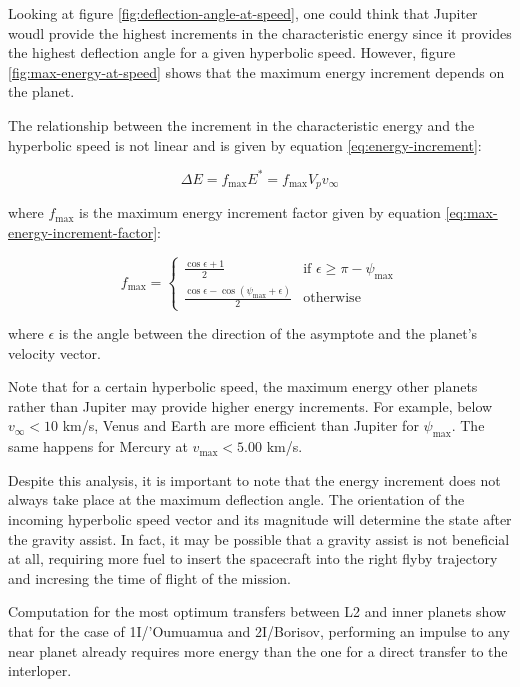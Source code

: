 Looking at figure \ref{fig:deflection-angle-at-speed}, one could think that
Jupiter woudl provide the highest increments in the characteristic energy since
it provides the highest deflection angle for a given hyperbolic speed. However,
figure \ref{fig:max-energy-at-speed} shows that the maximum energy increment
depends on the planet.

The relationship between the increment in the characteristic energy and the
hyperbolic speed is not linear and is given by equation
\ref{eq:energy-increment}:

\begin{equation}
  \Delta E = f_{\text{max}} E^{\ast} = f_{\text{max}} V_p v_{\infty}
  \label{eq:energy-increment}
\end{equation}

where $f_{\text{max}}$ is the maximum energy increment factor given by equation
\ref{eq:max-energy-increment-factor}:

\begin{equation}
  f_{\text{max}} = \begin{cases}
    \frac{\cos{\epsilon} + 1}{2}                                         & \text{if } \epsilon \geq \pi - \psi_{\max} \\
    \frac{\cos{\epsilon} - \cos{\left(\psi_{\max} + \epsilon\right)}}{2} & \text{otherwise}
  \end{cases}
  \label{eq:max-energy-increment-factor}
\end{equation}

where $\epsilon$ is the angle between the direction of the asymptote and the
planet's velocity vector.

Note that for a certain hyperbolic speed, the maximum energy other planets
rather than Jupiter may provide higher energy increments. For example, below
$v_{\infty} < 10$ km/s, Venus and Earth are more efficient than Jupiter for
$\psi_{\text{max}}$. The same happens for Mercury at $v_{\text{max}} < 5.00$
km/s.

Despite this analysis, it is important to note that the energy increment does
not always take place at the maximum deflection angle. The orientation of the
incoming hyperbolic speed vector and its magnitude will determine the state
after the gravity assist. In fact, it may be possible that a gravity assist is
not beneficial at all, requiring more fuel to insert the spacecraft into the
right flyby trajectory and incresing the time of flight of the mission.

Computation for the most optimum transfers between L2 and inner planets show
that for the case of 1I/'Oumuamua and 2I/Borisov, performing an impulse to any near
planet already requires more energy than the one for a direct transfer to the
interloper.
